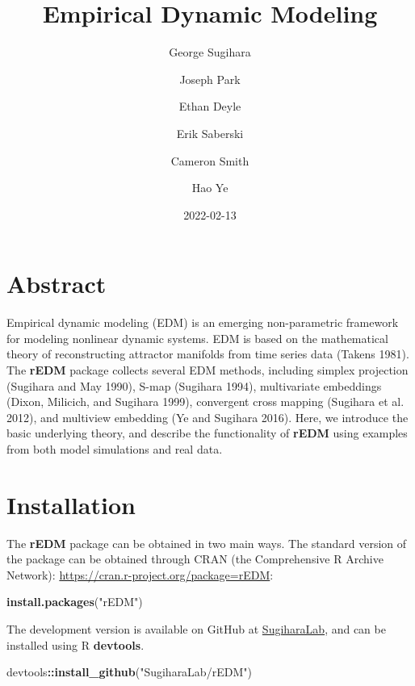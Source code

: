 \documentclass[]{article}
\title{Empirical Dynamic Modeling}
\author{George Sugihara \and Joseph Park \and Ethan Deyle \and Erik Saberski \and Cameron Smith \and Hao Ye}
\date{2022-02-13}
\newenvironment{Shaded}{\begin{snugshade}}{\end{snugshade}}
\newcommand{\KeywordTok}[1]{\textcolor[rgb]{0.13,0.29,0.53}{\textbf{#1}}}
\newcommand{\NormalTok}[1]{#1}
\newcommand{\OperatorTok}[1]{\textcolor[rgb]{0.81,0.36,0.00}{\textbf{#1}}}
\newcommand{\StringTok}[1]{\textcolor[rgb]{0.31,0.60,0.02}{#1}}
\begin{document}
\maketitle

\hypertarget{abstract}{%
\section{Abstract}\label{abstract}}

Empirical dynamic modeling (EDM) is an emerging non-parametric framework
for modeling nonlinear dynamic systems. EDM is based on the mathematical
theory of reconstructing attractor manifolds from time series data
(Takens 1981). The \textbf{rEDM} package collects several EDM methods,
including simplex projection (Sugihara and May 1990), S-map (Sugihara
1994), multivariate embeddings (Dixon, Milicich, and Sugihara 1999),
convergent cross mapping (Sugihara et al. 2012), and multiview embedding
(Ye and Sugihara 2016). Here, we introduce the basic underlying theory,
and describe the functionality of \textbf{rEDM} using examples from both
model simulations and real data.

\hypertarget{installation}{%
\section{Installation}\label{installation}}

The \textbf{rEDM} package can be obtained in two main ways. The standard
version of the package can be obtained through CRAN (the Comprehensive R
Archive Network): \url{https://cran.r-project.org/package=rEDM}:

\begin{Shaded}
\begin{Highlighting}[]
\KeywordTok{install.packages}\NormalTok{(}\StringTok{"rEDM"}\NormalTok{)}
\end{Highlighting}
\end{Shaded}

The development version is available on GitHub at
\href{github.com/SugiharaLab/rEDM}{SugiharaLab}, and can be installed
using R \textbf{devtools}.

\begin{Shaded}
\begin{Highlighting}[]
\NormalTok{devtools}\OperatorTok{::}\KeywordTok{install_github}\NormalTok{(}\StringTok{"SugiharaLab/rEDM"}\NormalTok{)}
\end{Highlighting}
\end{Shaded}
\end{document}
